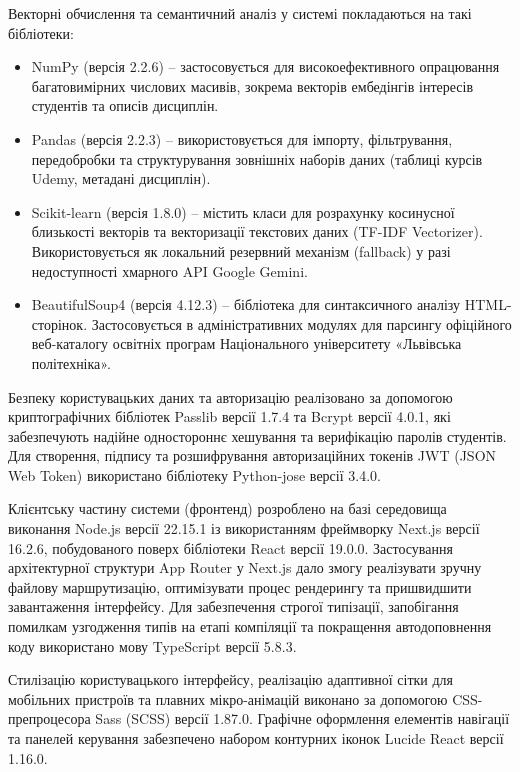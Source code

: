 \documentclass[
]{article}
\begin{document}
Векторні обчислення та семантичний аналіз у системі покладаються на такі
бібліотеки:

\begin{itemize}
\item
  NumPy (версія 2.2.6) -- застосовується для високоефективного
  опрацювання багатовимірних числових масивів, зокрема векторів
  ембедінгів інтересів студентів та описів дисциплін.
\item
  Pandas (версія 2.2.3) -- використовується для імпорту, фільтрування,
  передобробки та структурування зовнішніх наборів даних (таблиці курсів
  Udemy, метадані дисциплін).
\item
  Scikit-learn (версія 1.8.0) -- містить класи для розрахунку косинусної
  близькості векторів та векторизації текстових даних (TF-IDF
  Vectorizer). Використовується як локальний резервний механізм
  (fallback) у разі недоступності хмарного API Google Gemini.
\item
  BeautifulSoup4 (версія 4.12.3) -- бібліотека для синтаксичного аналізу
  HTML-сторінок. Застосовується в адміністративних модулях для парсингу
  офіційного веб-каталогу освітніх програм Національного університету
  «Львівська політехніка».
\end{itemize}

Безпеку користувацьких даних та авторизацію реалізовано за допомогою
криптографічних бібліотек Passlib версії 1.7.4 та Bcrypt версії 4.0.1,
які забезпечують надійне одностороннє хешування та верифікацію паролів
студентів. Для створення, підпису та розшифрування авторизаційних
токенів JWT (JSON Web Token) використано бібліотеку Python-jose версії
3.4.0.

Клієнтську частину системи (фронтенд) розроблено на базі середовища
виконання Node.js версії 22.15.1 із використанням фреймворку Next.js
версії 16.2.6, побудованого поверх бібліотеки React версії 19.0.0.
Застосування архітектурної структури App Router у Next.js дало змогу
реалізувати зручну файлову маршрутизацію, оптимізувати процес рендерингу
та пришвидшити завантаження інтерфейсу. Для забезпечення строгої
типізації, запобігання помилкам узгодження типів на етапі компіляції та
покращення автодоповнення коду використано мову TypeScript версії 5.8.3.

Стилізацію користувацького інтерфейсу, реалізацію адаптивної сітки для
мобільних пристроїв та плавних мікро-анімацій виконано за допомогою
CSS-препроцесора Sass (SCSS) версії 1.87.0. Графічне оформлення
елементів навігації та панелей керування забезпечено набором контурних
іконок Lucide React версії 1.16.0.
\end{document}
